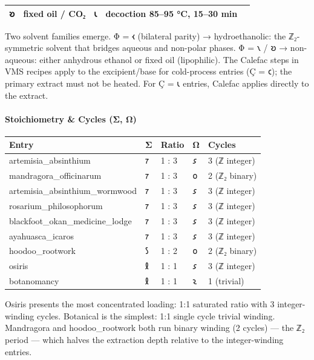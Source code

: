 \documentclass[12pt,a4paper]{article}
\begin{document}
\begin{longtable}[]{@{}lllll@{}}
\begin{minipage}[t]{0.17\columnwidth}
𐑹\strut
\end{minipage} & \begin{minipage}[t]{0.17\columnwidth}\raggedright
fixed oil / CO₂\strut
\end{minipage} & \begin{minipage}[t]{0.17\columnwidth}\raggedright
𐑧\strut
\end{minipage} & \begin{minipage}[t]{0.17\columnwidth}\raggedright
decoction 85--95 °C, 15--30 min\strut
\end{minipage}\tabularnewline
\bottomrule
\end{longtable}

Two solvent families emerge. Φ = 𐑬 (bilateral parity) → hydroethanolic:
the ℤ₂-symmetric solvent that bridges aqueous and non-polar phases. Φ =
𐑯 / 𐑹 → non-aqueous: either anhydrous ethanol or fixed oil (lipophilic).
The Calefac steps in VMS recipes apply to the excipient/base for
cold-process entries (Ç = 𐑤); the primary extract must not be heated.
For Ç = 𐑧 entries, Calefac applies directly to the extract.

\hypertarget{stoichiometry-cycles-ux3c3-ux3c9}{%
\paragraph{Stoichiometry \& Cycles (Σ,
Ω)}\label{stoichiometry-cycles-ux3c3-ux3c9}}

\begin{longtable}[]{@{}lllll@{}}
\toprule
Entry & Σ & Ratio & Ω & Cycles\tabularnewline
\midrule
\endhead
artemisia\_absinthium & 𐑳 & 1 : 3 & 𐑭 & 3 (ℤ integer)\tabularnewline
mandragora\_officinarum & 𐑳 & 1 : 3 & 𐑴 & 2 (ℤ₂ binary)\tabularnewline
artemisia\_absinthium\_wormwood & 𐑳 & 1 : 3 & 𐑭 & 3 (ℤ
integer)\tabularnewline
rosarium\_philosophorum & 𐑳 & 1 : 3 & 𐑭 & 3 (ℤ integer)\tabularnewline
blackfoot\_okan\_medicine\_lodge & 𐑳 & 1 : 3 & 𐑭 & 3 (ℤ
integer)\tabularnewline
ayahuasca\_icaros & 𐑳 & 1 : 3 & 𐑭 & 3 (ℤ integer)\tabularnewline
hoodoo\_rootwork & 𐑕 & 1 : 2 & 𐑴 & 2 (ℤ₂ binary)\tabularnewline
osiris & 𐑙 & 1 : 1 & 𐑭 & 3 (ℤ integer)\tabularnewline
botanomancy & 𐑙 & 1 : 1 & 𐑷 & 1 (trivial)\tabularnewline
\bottomrule
\end{longtable}

Osiris presents the most concentrated loading: 1:1 saturated ratio with
3 integer-winding cycles. Botanical is the simplest: 1:1 single cycle
trivial winding. Mandragora and hoodoo\_rootwork both run binary winding
(2 cycles) --- the ℤ₂ period --- which halves the extraction depth
relative to the integer-winding entries.
\end{document}
